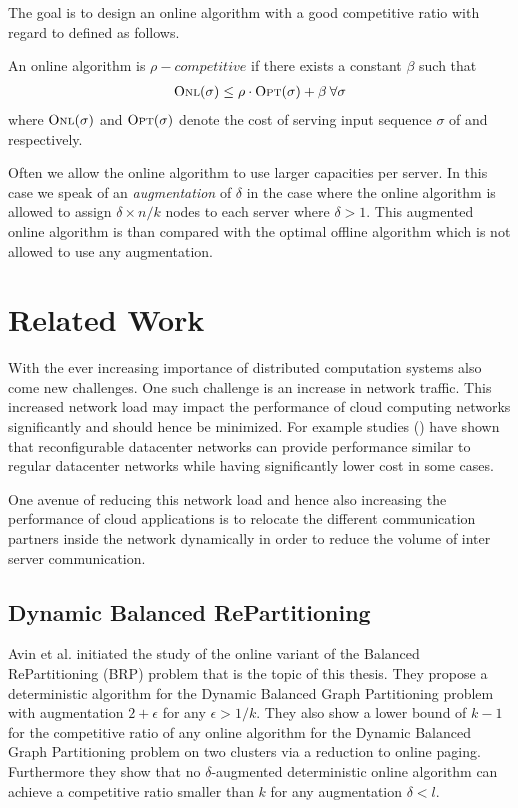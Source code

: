 \documentclass[a4paper,xcolor=dvipsnames, tikz, 12pt]{article}
\newcommand{\opt}{\text{O{\scriptsize PT}}}
\newcommand{\onl}{\text{O{\scriptsize NL}}}
\theoremstyle{definition}
\begin{document}
	The goal is to design an online algorithm \onl{} with a good competitive ratio with regard to \opt{} defined as follows.
	
	An online algorithm \onl{} is $\rho-competitive$ if there exists a constant $\beta$ such that 
	\begin{align*}
	\onl{}(\sigma)\leq\rho\cdot \opt{}(\sigma)+\beta\:\forall \sigma
	\end{align*} 
	where $\onl{}(\sigma)$ and $\opt{}(\sigma)$ denote the cost of serving input sequence $\sigma$ of \onl{} and \opt{} respectively.
	
	Often we allow the online algorithm to use larger capacities per server. In this case we speak of an \textit{augmentation} of $\delta$ in the case where the online algorithm is allowed to assign $\delta\times n/k$ nodes to each server where $\delta>1$. This augmented online algorithm is than compared with the optimal offline algorithm \opt{} which is not allowed to use any augmentation.
	
	\section{Related Work}
	
	With the ever increasing importance of distributed computation systems also come new challenges. One such challenge is an increase in network traffic. This increased network load may impact the performance of cloud computing networks significantly and should hence be minimized. For example studies (\cite{Ghobadi2016, Hamedazimi2014}) have shown that reconfigurable datacenter networks can provide performance similar to regular datacenter networks while having significantly lower cost in some cases.
	
	One avenue of reducing this network load and hence also increasing the performance of cloud applications is to relocate the different communication partners inside the network dynamically in order to reduce the volume of inter server communication.
	
	
	\subsection{Dynamic Balanced RePartitioning}
	Avin et al.\cite{Avin2015} initiated the study of the online variant of the Balanced RePartitioning (BRP) problem that is the topic of this thesis. They propose a deterministic algorithm for the Dynamic Balanced Graph Partitioning problem with augmentation $2+\epsilon$ for any $\epsilon>1/k$. They also show a lower bound of $k-1$ for the competitive ratio of any online algorithm for the Dynamic Balanced Graph Partitioning problem on two clusters via a reduction to online paging. Furthermore they show that no $\delta$-augmented deterministic online algorithm can achieve a competitive ratio smaller than $k$ for any augmentation $\delta<l$. %
	
\end{document}
